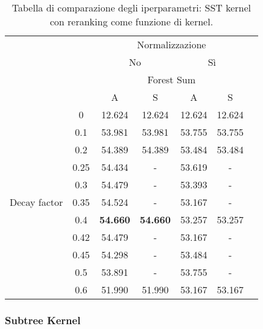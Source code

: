 \begin{table}[H]
    \centering
    \begin{tabular}{cc|ccccc}
        \toprule
        &       & \multicolumn{4}{c}{Normalizzazione}                           \\
        &       & \multicolumn{2}{c}{No} & \multicolumn{2}{c}{Sì}               \\
        \hline
        &       & \multicolumn{4}{c}{Forest Sum}                                \\
        &       & A                 & S                 & A         & S         \\
        \hline
        \multirow{12}{*}{\begin{sideways}Decay factor\end{sideways}} 
        & 0     & 12.624            & 12.624            & 12.624    & 12.624    \\
        & 0.1   & 53.981            & 53.981            & 53.755    & 53.755    \\
        & 0.2   & 54.389            & 54.389            & 53.484    & 53.484    \\
        & 0.25  & 54.434            & -                 & 53.619    & -         \\
        & 0.3   & 54.479            & -                 & 53.393    & -         \\
        & 0.35  & 54.524            & -                 & 53.167    & -         \\
        & 0.4   & \textbf{54.660}   & \textbf{54.660}   & 53.257    & 53.257    \\
        & 0.42  & 54.479            & -                 & 53.167    & -         \\
        & 0.45  & 54.298            & -                 & 53.484    & -         \\
        & 0.5   & 53.891            & -                 & 53.755    & -         \\
        & 0.6   & 51.990            & 51.990            & 53.167    & 53.167    \\
        \bottomrule
    \end{tabular}
    \caption{Tabella di comparazione degli iperparametri: SST kernel con
    reranking come funzione di kernel.}
\end{table}

\subsubsection{Subtree Kernel}

